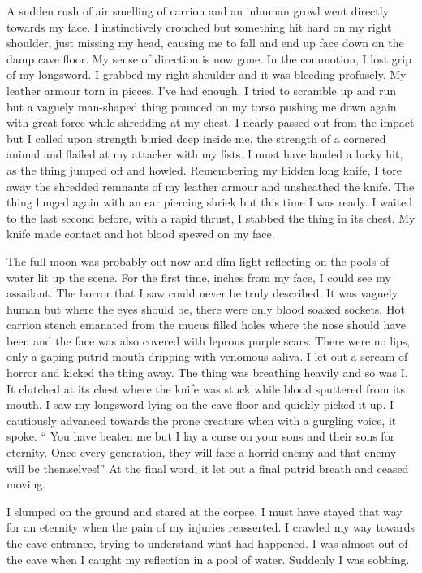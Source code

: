 A sudden rush of air smelling of carrion and an inhuman growl went
directly towards my face. I instinctively crouched but something
hit hard on my right shoulder, just missing my head, causing me to
fall and end up face down on the damp cave floor. My sense of
direction is now gone. In the commotion, I lost grip of my
longsword. I grabbed my right shoulder and it was bleeding
profusely. My leather armour torn in pieces. I've had enough.
I tried to scramble up and run but a vaguely man-shaped thing
pounced on my torso pushing me down again with great force while
shredding at my chest. I nearly passed out from the impact but I
called upon strength buried deep inside me, the strength of a
cornered animal and flailed at my attacker with my fists. I must
have landed a lucky hit, as the thing jumped off and howled.
Remembering my hidden long knife, I tore away the shredded remnants
of my leather armour and unsheathed the knife. The thing lunged
again with an ear piercing shriek but this time I was ready. I
waited to the last second before, with a rapid thrust, I stabbed
the thing in its chest. My knife made contact and hot blood spewed
on my face.





The full moon was probably out now and dim light reflecting on the
pools of water lit up the scene. For the first time, inches from my
face, I could see my assailant. The horror that I saw could never
be truly described. It was vaguely human but where the eyes should
be, there were only blood soaked sockets. Hot carrion stench
emanated from the mucus filled holes where the nose should have
been and the face was also covered with leprous purple scars. There
were no lips, only a gaping putrid mouth dripping with venomous
saliva. I let out a scream of horror and kicked the thing away. The
thing was breathing heavily and so was I. It clutched at its chest
where the knife was stuck while blood sputtered from its mouth. I
saw my longsword lying on the cave floor and quickly picked it up.
I cautiously advanced towards the prone creature when with a
gurgling voice, it spoke. `` You have beaten me but I lay a
curse on your sons and their sons for eternity. Once every
generation, they will face a horrid enemy and that enemy will be
themselves!'' At the final word, it let out a final putrid
breath and ceased moving.



I slumped on the ground and stared at the corpse. I must have
stayed that way for an eternity when the pain of my injuries
reasserted. I crawled my way towards the cave entrance, trying to
understand what had happened. I was almost out of the cave when I
caught my reflection in a pool of water. Suddenly I was sobbing. 

